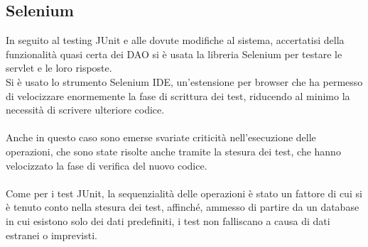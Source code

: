 \documentclass[12pt]{article}
\begin{document}
\subsection{Selenium}
In seguito al testing JUnit e alle dovute modifiche al sistema, accertatisi della funzionalità quasi certa dei DAO si è usata la libreria Selenium per testare le servlet e le loro risposte. \\
Si è usato lo strumento Selenium IDE, un'estensione per browser che ha permesso di velocizzare enormemente la fase di scrittura dei test, riducendo al minimo la necessità di scrivere ulteriore codice. \\ \\

Anche in questo caso sono emerse svariate criticità nell'esecuzione delle operazioni, che sono state risolte anche tramite la stesura dei test, che hanno velocizzato la fase di verifica del nuovo codice. \\ \\
Come per i test JUnit, la sequenzialità delle operazioni è stato un fattore di cui si è tenuto conto nella stesura dei test, affinché, ammesso di partire da un database in cui esistono solo dei dati predefiniti, i test non falliscano a causa di dati estranei o imprevisti.
\end{document}
